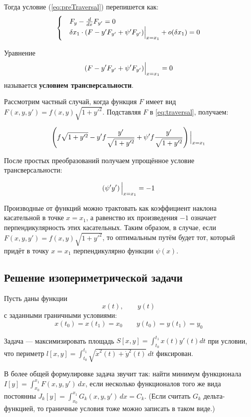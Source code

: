 \documentclass[12pt]{article}
\begin{document}
			Тогда условие (\ref{eq:preTraversal}) перепишется как:
			$$
				\begin{cases}
					&F_y - \frac{d}{dx} F_{y'} = 0 \\
					&\delta x_1 \cdot (F - y'F_{y'} + \psi' F_{y'})\Big|_{x=x_1}^{} + o(\delta x_1) = 0
				\end{cases} 
			$$

			Уравнение
			\begin{equation}
				\label{eq:traversal}
				(F - y' F_{y'} + \psi' F_{y'})\Big|_{x=x_1}^{} = 0
			\end{equation}
			называется \textbf{условием трансверсальности}.

			Рассмотрим частный случай, когда функция $F$ имеет вид $F(x, y, y') = f(x,y) \sqrt{1+y'^2}$.
			Подставляя $F$ в \ref{eq:traversal}, получаем:

			$$
				\left( f \sqrt{1+y'^2} - y' f \frac{y'}{\sqrt{1+y'^2}} + \psi' f \frac{y'}{\sqrt{1+y'^2}} \right) \Big|_{x=x_1}^{}
			$$

			После простых преобразований получаем упрощённое условие трансверсальности:

			$$\left( \psi' y' \right) \Big|_{x=x_1}^{} = -1$$

			Производные от функций можно трактовать как коэффициент наклона касательной в точке $x=x_1$, а равенство их произведения $-1$ означает перпендикулярность этих касательных. Таким образом, в случае, если $F(x, y, y') = f(x,y) \sqrt{1+y'^2}$, то оптимальным путём будет тот, который придёт в точку $x=x_1$ перпендикулярно функции $\psi(x)$.

	\subsection{Решение изопериметрической задачи}


		Пусть даны функции 
		$$x(t),\qquad y(t)$$
		с заданными граничными условиями:
		$$x(t_0) = x(t_1) = x_0 \qquad y(t_0) = y(t_1) = y_0$$

		Задача --- максимизировать площадь $S[x,y] = \int_{t_0}^{t_1}x(t)y'(t) dt$ при условии, что периметр
		$l[x,y] = \int_{t_0}^{t_1} \sqrt{\dot{x}^2(t) + \dot{y}^2(t)}\,dt$ фиксирован.

		В более общей формулировке задача звучит так: найти минимум функционала
		$I[y] = \int_{x_0}^{x_1} F(x,y,y')\,dx$, если несколько функционалов того же вида постоянны
		$J_k[y] = \int_{x_0}^{x_1} G_k(x,y,y')\,dx = C_k$. (Если считать $G_k$ дельта-функцией, то граничные
		условия тоже можно записать в таком виде.)
\end{document}
